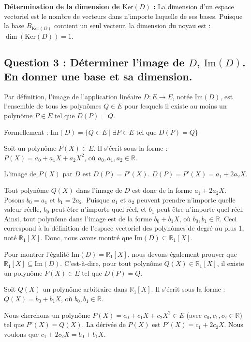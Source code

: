 \documentclass{report}
\begin{document}
\textbf{Détermination de la dimension de $\text{Ker}(D)$ :}
La dimension d'un espace vectoriel est le nombre de vecteurs dans n'importe laquelle de ses bases.
Puisque la base $B_{\text{Ker}(D)}$ contient un seul vecteur, la dimension du noyau est :
$\dim(\text{Ker}(D)) = 1$.

\subsection*{Question 3 : Déterminer l'image de $D$, $\text{Im}(D)$. En donner une base et sa dimension.}

Par définition, l'image de l'application linéaire $D: E \to E$, notée $\text{Im}(D)$, est l'ensemble de tous les polynômes $Q \in E$ pour lesquels il existe au moins un polynôme $P \in E$ tel que $D(P) = Q$.

Formellement :
$\text{Im}(D) = \{ Q \in E \mid \exists P \in E \text{ tel que } D(P) = Q \}$

Soit un polynôme $P(X) \in E$. Il s'écrit sous la forme :
$P(X) = a_0 + a_1 X + a_2 X^2$, où $a_0, a_1, a_2 \in \mathbb{R}$.

L'image de $P(X)$ par $D$ est $D(P) = P'(X)$.
$D(P) = P'(X) = a_1 + 2a_2 X$.

Tout polynôme $Q(X)$ dans l'image de $D$ est donc de la forme $a_1 + 2a_2 X$.
Posons $b_0 = a_1$ et $b_1 = 2a_2$. Puisque $a_1$ et $a_2$ peuvent prendre n'importe quelle valeur réelle, $b_0$ peut être n'importe quel réel, et $b_1$ peut être n'importe quel réel.
Ainsi, tout polynôme dans l'image est de la forme $b_0 + b_1 X$, où $b_0, b_1 \in \mathbb{R}$.
Ceci correspond à la définition de l'espace vectoriel des polynômes de degré au plus 1, noté $\mathbb{R}_1[X]$.
Donc, nous avons montré que $\text{Im}(D) \subseteq \mathbb{R}_1[X]$.

Pour montrer l'égalité $\text{Im}(D) = \mathbb{R}_1[X]$, nous devons également prouver que $\mathbb{R}_1[X] \subseteq \text{Im}(D)$. C'est-à-dire, pour tout polynôme $Q(X) \in \mathbb{R}_1[X]$, il existe un polynôme $P(X) \in E$ tel que $D(P) = Q$.

Soit $Q(X)$ un polynôme arbitraire dans $\mathbb{R}_1[X]$. Il s'écrit sous la forme :
$Q(X) = b_0 + b_1 X$, où $b_0, b_1 \in \mathbb{R}$.

Nous cherchons un polynôme $P(X) = c_0 + c_1 X + c_2 X^2 \in E$ (avec $c_0, c_1, c_2 \in \mathbb{R}$) tel que $P'(X) = Q(X)$.
La dérivée de $P(X)$ est $P'(X) = c_1 + 2c_2 X$.
Nous voulons que $c_1 + 2c_2 X = b_0 + b_1 X$.
\end{document}
